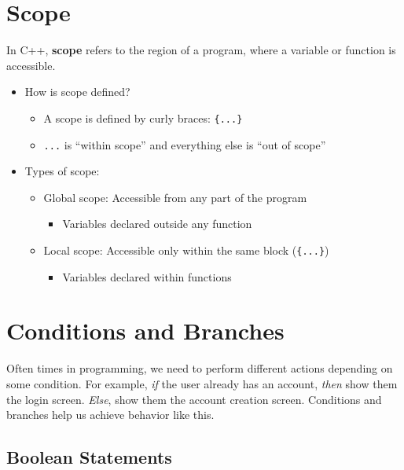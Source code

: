 \documentclass{article}
\begin{document}
\section{Scope}

\noindent
In C++, \textbf{scope} refers to the region of a program, where a variable or function is accessible.

\begin{itemize}
	\item How is scope defined?
	\begin{itemize}
		\item A scope is defined by curly braces: \texttt{\{...\}}
		\item \texttt{...} is ``within scope'' and everything else is ``out of scope''
	\end{itemize}
	\item Types of scope:
	\begin{itemize}
		\item Global scope: Accessible from any part of the program
		\begin{itemize}
			\item Variables declared outside any function
		\end{itemize}
		\item Local scope: Accessible only within the same block (\texttt{\{...\}})
		\begin{itemize}
			\item Variables declared within functions
		\end{itemize}
	\end{itemize}
\end{itemize}



\section{Conditions and Branches}

\noindent
Often times in programming, we need to perform different actions depending on some condition. For example, \textit{if} the user already has an account, \textit{then} show them the login screen. \textit{Else}, show them the account creation screen. Conditions and branches help us achieve behavior like this.

\subsection{Boolean Statements}
\end{document}
